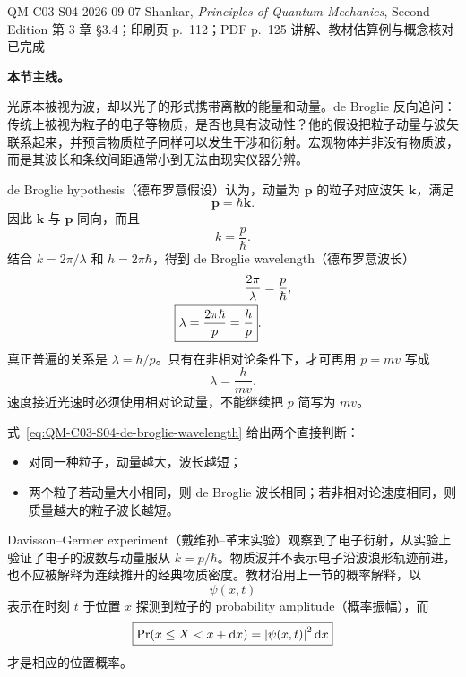 \studymeta
  {QM-C03-S04}
  {2026-09-07}
  {Shankar, \textit{Principles of Quantum Mechanics}, Second Edition}
  {第 3 章 \S 3.4；印刷页 p.~112；PDF p.~125}
  {讲解、教材估算例与概念核对已完成}

\textbf{本节主线。}

光原本被视为波，却以光子的形式携带离散的能量和动量。de Broglie 反向追问：传统上被视为粒子的电子等物质，是否也具有波动性？他的假设把粒子动量与波矢联系起来，并预言物质粒子同样可以发生干涉和衍射。宏观物体并非没有物质波，而是其波长和条纹间距通常小到无法由现实仪器分辨。


de Broglie hypothesis（德布罗意假设）认为，动量为 $\bm p$ 的粒子对应波矢 $\bm k$，满足
\begin{equation}
  \boxed{\bm p=\hbar\bm k}.
  \label{eq:QM-C03-S04-de-broglie-vector}
\end{equation}
因此 $\bm k$ 与 $\bm p$ 同向，而且
\begin{equation}
  k=\frac{p}{\hbar}.
  \label{eq:QM-C03-S04-wave-number}
\end{equation}
结合 $k=2\pi/\lambda$ 和 $h=2\pi\hbar$，得到 de Broglie wavelength（德布罗意波长）
\begin{align}
  \frac{2\pi}{\lambda}
  &=\frac{p}{\hbar},
  \notag\\
  \boxed{\lambda=\frac{2\pi\hbar}{p}=\frac{h}{p}}.
  \label{eq:QM-C03-S04-de-broglie-wavelength}
\end{align}
真正普遍的关系是 $\lambda=h/p$。只有在非相对论条件下，才可再用 $p=mv$ 写成
\begin{equation}
  \boxed{\lambda=\frac{h}{mv}}.
  \label{eq:QM-C03-S04-nonrelativistic-wavelength}
\end{equation}
速度接近光速时必须使用相对论动量，不能继续把 $p$ 简写为 $mv$。

式~\eqref{eq:QM-C03-S04-de-broglie-wavelength} 给出两个直接判断：
\begin{itemize}[leftmargin=*]
  \item 对同一种粒子，动量越大，波长越短；
  \item 两个粒子若动量大小相同，则 de Broglie 波长相同；若非相对论速度相同，则质量越大的粒子波长越短。
\end{itemize}

Davisson--Germer experiment（戴维孙--革末实验）观察到了电子衍射，从实验上验证了电子的波数与动量服从 $k=p/\hbar$。物质波并不表示电子沿波浪形轨迹前进，也不应被解释为连续摊开的经典物质密度。教材沿用上一节的概率解释，以
\begin{equation}
  \psi(x,t)
  \label{eq:QM-C03-S04-matter-wave-amplitude}
\end{equation}
表示在时刻 $t$ 于位置 $x$ 探测到粒子的 probability amplitude（概率振幅），而
\begin{equation}
  \boxed{
  \Pr(x\leq X<x+\mathop{}\!\mathrm{d} x)
  =\left|\psi(x,t)\right|^2\mathop{}\!\mathrm{d} x}
  \label{eq:QM-C03-S04-matter-wave-born-rule}
\end{equation}
才是相应的位置概率。

